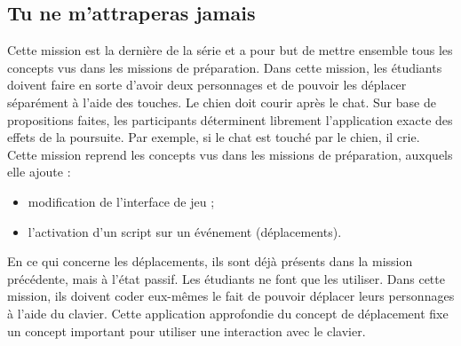\subsection{Tu ne m'attraperas jamais}
\label{chien-chat}
Cette \gls{mission} est la dernière de la série et a pour but de mettre ensemble tous les concepts vus dans les \glspl{mission} de préparation. Dans cette \gls{mission}, les étudiants doivent faire en sorte d'avoir deux personnages et de pouvoir les déplacer séparément à l'aide des touches. Le chien doit courir après le chat. Sur base de propositions faites, les participants déterminent librement l'application exacte des effets de la poursuite. Par exemple, si le chat est touché par le chien, il crie.\\

Cette \gls{mission} reprend les concepts vus dans les \glspl{mission} de préparation, auxquels elle ajoute :
\begin{itemize}
\item modification de l'interface de jeu ;
\item l'activation d'un \gls{script} sur un événement (déplacements).
\end{itemize}

En ce qui concerne les déplacements, ils sont déjà présents dans la \gls{mission} précédente, mais à l'état passif. Les étudiants ne font que les utiliser. Dans cette \gls{mission}, ils doivent coder eux-mêmes le fait de pouvoir déplacer leurs personnages à l'aide du clavier. Cette application approfondie du concept de déplacement fixe un concept important pour utiliser une interaction avec le clavier.

